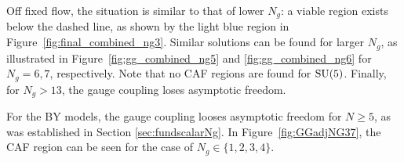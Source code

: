 Off fixed flow, the situation is similar to that of lower $N_g$: a viable region exists below the dashed line, as shown by the light blue region in Figure~\ref{fig:final_combined_ng3}. Similar solutions can be found for larger $N_g$, as illustrated in Figure~\ref{fig:gg_combined_ng5} and \ref{fig:gg_combined_ng6} for $N_g=6,7$, respectively. Note that no CAF regions are found for $\mathrm{SU}(5)$. Finally, for $N_g>13$, the gauge coupling loses asymptotic freedom.

For the BY models, the gauge coupling looses asymptotic freedom for $N \geq 5$, as was established in Section \ref{sec:fundscalarNg}. In Figure~\ref{fig:GGadjNG37}, the CAF region can be seen for the case of $N_g\in\{1,2,3,4\}$.




